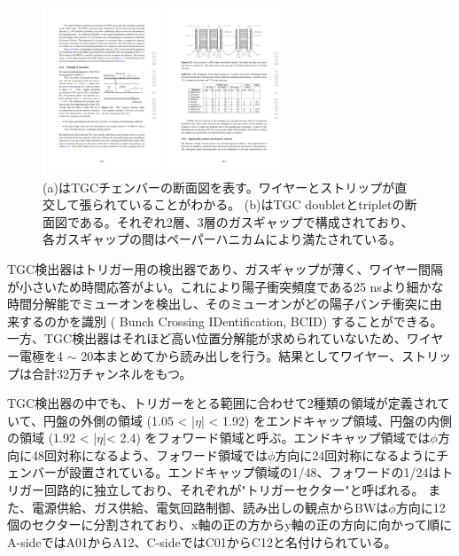 \begin{figure}
\begin{minipage}[b]{.4\linewidth}
\centering
\includegraphics[height=5cm]{fig/Intro/TGC_structure.pdf}
\end{minipage}%
\begin{minipage}[b]{.6\linewidth}
\centering
\includegraphics[height=5cm]{fig/Intro/TGC_crosssection.pdf}
\end{minipage}%
\caption[TGCチェンバーの断面図]{ (a)はTGCチェンバーの断面図を表す\cite{JINST:2008}。ワイヤーとストリップが直交して張られていることがわかる。 (b)はTGC doubletとtripletの断面図である。それぞれ2層、3層のガスギャップで構成されており、各ガスギャップの間はペーパーハニカムにより満たされている。}
\label{TGC_structure}
\end{figure}

TGC検出器はトリガー用の検出器であり、ガスギャップが薄く、ワイヤー間隔が小さいため時間応答がよい。これにより陽子衝突頻度である25 nsより細かな時間分解能でミューオンを検出し、そのミューオンがどの陽子バンチ衝突に由来するのかを識別 ( Bunch Crossing IDentification, BCID) することができる。一方、TGC検出器はそれほど高い位置分解能が求められていないため、ワイヤー電極を4 $\sim$ 20本まとめてから読み出しを行う。結果としてワイヤー、ストリップは合計32万チャンネルをもつ。

TGC検出器の中でも、トリガーをとる範囲に合わせて2種類の領域が定義されていて、円盤の外側の領域  (1.05 < |$\eta$| < 1.92) をエンドキャップ領域、円盤の内側の領域  (1.92 < |$\eta$|< 2.4) をフォワード領域と呼ぶ。エンドキャップ領域では$\phi$方向に48回対称になるよう、フォワード領域では$\phi$方向に24回対称になるようにチェンバーが設置されている。エンドキャップ領域の1/48、フォワードの1/24はトリガー回路的に独立しており、それぞれが"トリガーセクター"と呼ばれる。
また、電源供給、ガス供給、電気回路制御、読み出しの観点からBWは$\phi$方向に12個のセクターに分割されており、x軸の正の方からy軸の正の方向に向かって順にA-sideではA01からA12、C-sideではC01からC12と名付けられている。



